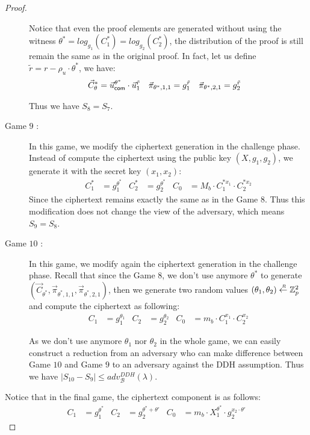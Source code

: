 \begin{proof}
\begin{description}
    Notice that even the proof elements are generated without using the witness $\theta^* = log_{g_1}(C_1^*) = log_{g_2}(C_2^*)$, the distribution of the proof is still remain the same as in the original proof. In fact, let us define $\tilde{r} = r - \rho_u \cdot \theta^*$, we have:
    \begin{align*}
      \vec{C}_{\theta}^* &= \vec{u}_{\mathsf{com}}^{\theta^*} \cdot \vec{u}_1^{\tilde{r}} &  \vec{\pi}_{\theta^*,1,1} &= g_1^{\tilde{r}} & \vec{\pi}_{\theta^*,2,1} &= g_2^{\tilde{r}}
    \end{align*}

    Thus we have $S_8 = S_7$.

  \item[\textsf{Game} $9$ :] In this game, we modify the ciphertext generation in the challenge phase. Instead of compute the ciphertext using the public key $(X, g_1, g_2)$, we generate it with the secret key $(x_1, x_2)$:
    \begin{align*}
      C_1^* &= g_1^{\theta^*} & C_2^* &= g_2^{\theta^*} & C_0 &= M_b\cdot C_1^{*x_1} \cdot C_2^{*x_2}  
    \end{align*}
    Since the ciphertext remains exactly the same as in the \textsf{Game} $8$. Thus this modification does not change the view of the adversary, which means $S_9 = S_8$.


  \item[\textsf{Game} $10$ :] In this game, we modify again the ciphertext generation in the challenge phase. Recall that since the \textsf{Game} $8$, we don't use anymore $\theta^{*}$ to generate $(\vec{C}_{\theta^*}, \vec{\pi}_{\theta^*,1,1}, \vec{\pi}_{\theta^*,2,1})$, then we generate two random values $(\theta_1, \theta_2) \stackrel{{\scriptscriptstyle \mkern4mu R}}{\gets} \mathbb{Z}_p^2$ and compute the ciphertext as following:
    \begin{align*}
      C_1 &= g_1^{\theta_1} & C_2 &= g_2^{\theta_2} & C_0 &= m_b \cdot C_1^{x_1} \cdot C_2^{x_2}
    \end{align*}

    As we don't use anymore $\theta_1$ nor $\theta_2$ in the whole game, we can easily construct a reduction from an adversary who can make difference between \textsf{Game} $10$ and \textsf{Game} $9$ to an adversary against the DDH assumption. Thus we have $|S_{10} - S_9| \leq adv_{\mathcal{B}}^{DDH}(\lambda)$.
    
  \end{description}

  Notice that in the final game, the ciphertext component is as follows:
  \begin{align*}
    C_1 &= g_1^{\theta^*} & C_2 &= g_2^{\theta^*+ \theta'} & C_0 &= m_b \cdot X_1^{\theta^*} \cdot g_2^{x_2 \cdot \theta'}
  \end{align*}


\end{proof}
